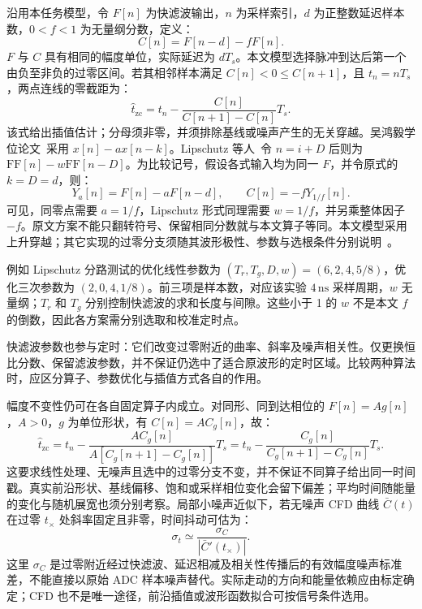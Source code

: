 沿用本任务模型，令 $F[n]$ 为快滤波输出，$n$ 为采样索引，$d$ 为正整数延迟样本数，$0<f<1$ 为无量纲分数，定义：
\begin{equation}\label{eq:5-4-cn}
C[n] = F[n-d] - f F[n].
\end{equation}
$F$ 与 $C$ 具有相同的幅度单位，实际延迟为 $d T_s$。本文模型选择脉冲到达后第一个由负至非负的过零区间。若其相邻样本满足 $C[n]<0\le C[n+1]$，且 $t_n=n T_s$，两点连线的零截距为：
\begin{equation}\label{eq:5-4-linear-zc}
\widehat{t}_{\mathrm{zc}} = t_n - \frac{C[n]}{C[n+1]-C[n]} T_s.
\end{equation}
该式给出插值估计；分母须非零，并须排除基线或噪声产生的无关穿越。吴鸿毅学位论文~\cite[第~25~页，式~(1.22)]{wu-hongyi-2020-general-purpose-digital-daq-thesis}采用 $x[n]-a x[n-k]$。Lipschutz 等人~\cite[式~(3)]{doctoral-r1-g32-lipschutz-2016-pixie16-ddas-timing}令 $n=i+D$ 后则为 $\mathrm{FF}[n]-w\mathrm{FF}[n-D]$。为比较记号，假设各式输入均为同一 $F$，并令原式的 $k=D=d$，则：
\begin{equation}\label{eq:5-4-cfd-map}
Y_a[n] = F[n] - a F[n-d], \qquad C[n] = -f Y_{1/f}[n].
\end{equation}
可见，同零点需要 $a=1/f$，Lipschutz 形式同理需要 $w=1/f$，并另乘整体因子 $-f$。原文方案不能只翻转符号、保留相同分数就与本文算子等同。本文模型采用上升穿越；其它实现的过零分支须随其波形极性、参数与选根条件分别说明~\cite{wu-hongyi-2020-general-purpose-digital-daq-thesis, doctoral-r1-g32-lipschutz-2016-pixie16-ddas-timing}。

例如 Lipschutz 分路测试的优化线性参数为 $(T_r, T_g, D, w)=(6, 2, 4, 5/8)$，优化三次参数为 $(2, 0, 4, 1/8)$。前三项是样本数，对应该实验 $4\,\mathrm{ns}$ 采样周期，$w$ 无量纲；$T_r$ 和 $T_g$ 分别控制快滤波的求和长度与间隙。这些小于 1 的 $w$ 不是本文 $f$ 的倒数，因此各方案需分别选取和校准定时点。

快滤波参数也参与定时：它们改变过零附近的曲率、斜率及噪声相关性。仅更换恒比分数、保留滤波参数，并不保证仍选中了适合原波形的定时区域。比较两种算法时，应区分算子、参数优化与插值方式各自的作用。

幅度不变性仍可在各自固定算子内成立。对同形、同到达相位的 $F[n]=A g[n]$，$A>0$，$g$ 为单位形状，有 $C[n]=A C_g[n]$，故：
\begin{equation}\label{eq:5-4-amp-inv}
\widehat{t}_{\mathrm{zc}} = t_n - \frac{A C_g[n]}{A [C_g[n+1]-C_g[n]]} T_s = t_n - \frac{C_g[n]}{C_g[n+1]-C_g[n]} T_s.
\end{equation}
这要求线性处理、无噪声且选中的过零分支不变，并不保证不同算子给出同一时间戳。真实前沿形状、基线偏移、饱和或采样相位变化会留下偏差；平均时间随能量的变化与随机展宽也须分别考察。局部小噪声近似下，若无噪声 CFD 曲线 $\bar{C}(t)$ 在过零 $t_\times$ 处斜率固定且非零，时间抖动可估为：
\begin{equation}\label{eq:5-4-timing-jitter}
\sigma_t \simeq \frac{\sigma_C}{|\bar{C}'(t_\times)|}.
\end{equation}
这里 $\sigma_C$ 是过零附近经过快滤波、延迟相减及相关性传播后的有效幅度噪声标准差，不能直接以原始 ADC 样本噪声替代。实际走动的方向和能量依赖应由标定确定；CFD 也不是唯一途径，前沿插值或波形函数拟合可按信号条件选用。

